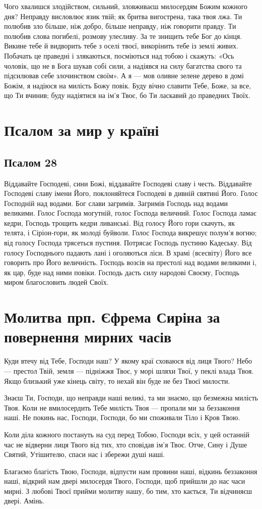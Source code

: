 \documentclass[chapters.tex]{subfiles}
\begin{document}
Чого хвалишся злодійством, сильний, зловживаєш милосердям Божим кожного дня? Неправду висловлює язик твій; як бритва вигострена, така твоя лжа. Ти полюбив зло більше, ніж добро, більше неправду, ніж говорити правду. Ти полюбив слова погибелі, розмову улесливу. За те знищить тебе Бог до кінця. Викине тебе й видворить тебе з оселі твоєї, викорінить тебе із землі живих. Побачать це праведні і злякаються, посміються над тобою і скажуть: «Ось чоловік, що не в Бога шукав собі сили, а надіявся на силу багатства свого та підсилював себе злочинством своїм». А я — мов оливне зелене дерево в домі Божім, я надіюся на милість Божу повік. Буду вічно славити Тебе, Боже, за все, що Ти вчинив; буду надіятися на ім’я Твоє, бо Ти ласкавий до праведних Твоїх.

\section{Псалом за мир у країні}
\subsection{Псалом 28}

Віддавайте Господеві, сини Божі, віддавайте Господеві славу і честь. Віддавайте Господеві славу імени Його, поклоняйтеся Господеві в дивній святині Його. Голос Господній над водами. Бог слави загримів. Загримів Господь над водами великими. Голос Господа могутній, голос Господа величний. Голос Господа ламає кедри, Господь трощить кедри ливанські. Від голосу Його гори скачуть, як телята, і Сіріон-гори, як молоді буйволи. Голос Господа викрешує полум’я вогню; від голосу Господа трясеться пустиня. Потрясає Господь пустиню Кадеську. Від голосу Господнього падають лані і оголяються ліси. В храмі (всесвіту) Його все говорить про Його величність. Господь возсів на престолі над водами великими і, як цар, буде над ними повіки. Господь дасть силу народові Своєму, Господь миром благословить людей Своїх.

\section{Молитва прп. Єфрема Сиріна за повернення мирних часів}
Куди втечу від Тебе, Господи наш? У якому краї сховаюся від лиця Твого? Небо — престол Твій, земля — підніжжя Твоє, у морі шляхи Твої, у пеклі влада Твоя. Якщо близький уже кінець світу, то нехай він буде не без Твоєї милости.

Знаєш Ти, Господи, що неправди наші великі, та ми знаємо, що безмежна милість Твоя. Коли не вмилосердить Тебе милість Твоя — пропали ми за беззаконня наші. Не покинь нас, Господи, Господи, бо ми споживали Тіло і Кров Твою.

Коли діла кожного постануть на суд перед Тобою, Господи всіх, у цей останній час не відверни лиця Твого від тих, хто сповідав ім’я Твоє. Отче, Сину і Душе Святий, Утішителю, спаси нас і збережи душі наші.

Благаємо благість Твою, Господи, відпусти нам провини наші, відкинь беззаконня наші, відкрий нам двері милосердя Твого, Господи, щоб прийшли до нас часи мирні. З любові Твоєї прийми молитву нашу, бо тим, хто кається, Ти відчиняєш двері. Амінь.
\end{document}
